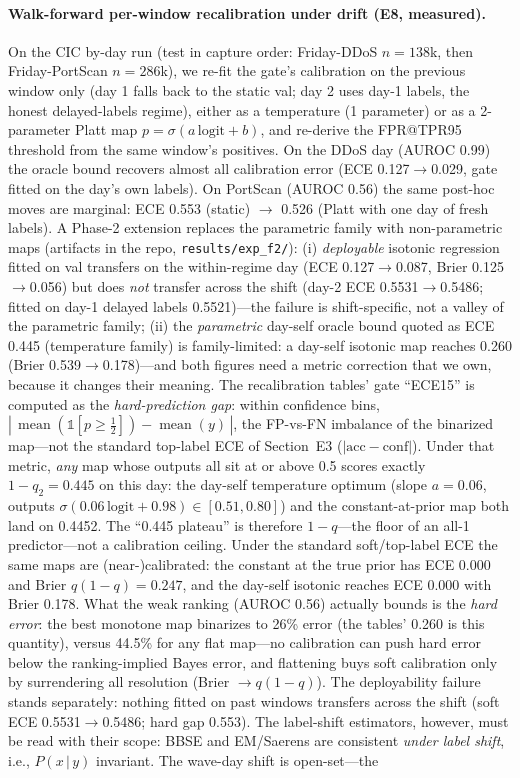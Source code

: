 \documentclass[sigconf,anonymous=false]{acmart}
\begin{document}
\paragraph{Walk-forward per-window recalibration under drift (E8, measured).} On the CIC by-day run (test in capture order: Friday-DDoS $n{=}138$k, then Friday-PortScan $n{=}286$k), we re-fit the gate's calibration on the previous window only (day 1 falls back to the static val; day 2 uses day-1 labels, the honest delayed-labels regime), either as a temperature (1 parameter) or as a 2-parameter Platt map $p{=}\sigma(a\,\mathrm{logit}{+}b)$, and re-derive the FPR@TPR95 threshold from the same window's positives. On the DDoS day (AUROC 0.99) the oracle bound recovers almost all calibration error (ECE 0.127$\to$0.029, gate fitted on the day's own labels). On PortScan (AUROC 0.56) the same post-hoc moves are marginal: ECE 0.553 (static) $\to$ 0.526 (Platt with one day of fresh labels). A Phase-2 extension replaces the parametric family with non-parametric maps (artifacts in the repo, \texttt{results/exp\_f2/}): (i) \emph{deployable} isotonic regression fitted on val transfers on the within-regime day (ECE 0.127$\to$0.087, Brier 0.125$\to$0.056) but does \emph{not} transfer across the shift (day-2 ECE 0.5531$\to$0.5486; fitted on day-1 delayed labels 0.5521)---the failure is shift-specific, not a valley of the parametric family; (ii) the \emph{parametric} day-self oracle bound quoted as ECE 0.445 (temperature family) is family-limited: a day-self isotonic map reaches 0.260 (Brier 0.539$\to$0.178)---and both figures need a metric correction that we own, because it changes their meaning. The recalibration tables' gate ``ECE15'' is computed as the \emph{hard-prediction gap}: within confidence bins, $|\,\operatorname{mean}(\mathbb{1}[p\ge\tfrac12])-\operatorname{mean}(y)\,|$, the FP-vs-FN imbalance of the binarized map---not the standard top-label ECE of Section~E3 ($|\mathrm{acc}-\mathrm{conf}|$). Under that metric, \emph{any} map whose outputs all sit at or above 0.5 scores exactly $1-q_2=0.445$ on this day: the day-self temperature optimum (slope $a{=}0.06$, outputs $\sigma(0.06\,\mathrm{logit}+0.98)\in[0.51,0.80]$) and the constant-at-prior map both land on 0.4452. The ``0.445 plateau'' is therefore $1-q$---the floor of an all-1 predictor---not a calibration ceiling. Under the standard soft/top-label ECE the same maps are (near-)calibrated: the constant at the true prior has ECE 0.000 and Brier $q(1{-}q)=0.247$, and the day-self isotonic reaches ECE 0.000 with Brier 0.178. What the weak ranking (AUROC 0.56) actually bounds is the \emph{hard error}: the best monotone map binarizes to 26\% error (the tables' 0.260 is this quantity), versus 44.5\% for any flat map---no calibration can push hard error below the ranking-implied Bayes error, and flattening buys soft calibration only by surrendering all resolution (Brier $\to q(1{-}q)$). The deployability failure stands separately: nothing fitted on past windows transfers across the shift (soft ECE 0.5531$\to$0.5486; hard gap 0.553). The label-shift estimators, however, must be read with their scope: BBSE and EM/Saerens are consistent \emph{under label shift}, i.e., $P(x\,|\,y)$ invariant. The wave-day shift is open-set---the 
\end{document}
